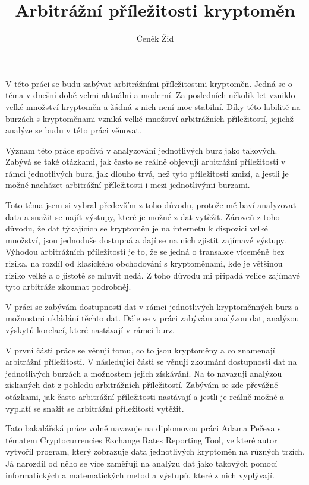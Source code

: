 \documentclass[thesis=B,czech]{FITthesis}[2019/03/21]
\title{Arbitrážní příležitosti kryptoměn}
\author{Čeněk Žid} %
\begin{document}

\begin{introduction}
V této práci se budu zabývat arbitrážními příležitostmi kryptoměn. Jedná se o téma v dnešní době velmi aktuální a moderní. Za posledních několik let vzniklo velké množství kryptoměn a žádná z nich není moc stabilní. Díky této labilitě na burzách s kryptoměnami vzniká velké množství arbitrážních příležitostí, jejichž analýze se budu v této práci věnovat.

Význam této práce spočívá v analyzování jednotlivých burz jako takových. Zabývá se také otázkami, jak často se reálně objevují arbitrážní příležitosti v rámci jednotlivých burz, jak dlouho trvá, než tyto příležitosti zmizí, a jestli je možné nacházet arbitrážní příležitosti i mezi jednotlivými burzami.

Toto téma jsem si vybral především z toho důvodu, protože mě baví analyzovat data a snažit se najít výstupy, které je možné z dat vytěžit. Zároveň z toho důvodu, že dat týkajících se kryptoměn je na internetu k dispozici velké množství, jsou jednoduše dostupná a dají se na nich zjistit zajímavé výstupy. Výhodou arbitrážních příležitostí je to, že se jedná o transakce víceméně bez rizika, na rozdíl od klasického obchodování s kryptoměnami, kde je většinou riziko velké a o jistotě se mluvit nedá. Z toho důvodu mi připadá velice zajímavé tyto arbitráže zkoumat podrobněj. 

V práci se zabývám dostupností dat v rámci jednotlivých kryptoměnných burz a možnostmi ukládání těchto dat. Dále se v práci zabývám analýzou dat, analýzou výskytů korelací, které nastávají v rámci burz.

V první části práce se věnuji tomu, co to jsou kryptoměny a co znamenají arbitrážní příležitosti. V následující části se věnuji zkoumání dostupnosti dat na jednotlivých burzách a možnostem jejich získávání. Na to navazuji analýzou získaných dat z pohledu arbitrážních příležitostí. Zabývám se zde převážně otázkami, jak často arbitrážní příležitosti nastávají a jestli je reálně možné a vyplatí se snažit se arbitrážní příležitosti vytěžit.

Tato bakalářská práce volně navazuje na diplomovou práci Adama Pečeva s tématem Cryptocurrencies Exchange Rates Reporting Tool, ve které autor vytvořil program, který zobrazuje data jednotlivých kryptoměn na různých trzích. Já narozdíl od něho se více zaměřuji na analýzu dat jako takových pomocí informatických a matematických metod a výstupů, které z nich vyplývají.

\end{introduction}
\end{document}
